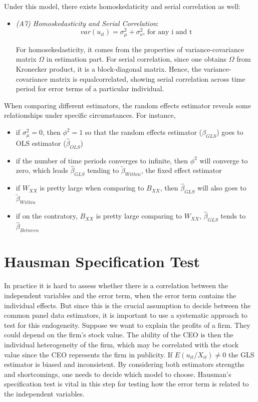 \documentclass[11pt, a4paper, leqno]{article}
\begin{document}
Under this model, there exists homoskedaticity and serial correlation as well:
\begin{itemize}
    \item \textit {(A7) Homoskedasticity and Serial Correlation}:
    \begin{equation}
    var(u_{it}) = \sigma_\mu^2 + \sigma_\nu^2 \text{, for any i and t}
    \end{equation}

    For homosekedasticity, it comes from the properties of variance-covariance matrix $\Omega$ in estimation part. For serial correlation, since one obtains $\Omega$ from Kronecker product, it is a block-diagonal matrix. Hence, the variance-covariance matrix is equalcorrelated, showing serial correlation across time period for error terms of a particular individual.
\end{itemize}

When comparing different estimators, the random effects estimator reveals some relationships under specific circumstances.
For instance, 
\begin{itemize}
    \item if $\sigma_\mu^2 = 0$, then $\phi^2 = 1$ so that the random effects estimator ($\widehat \beta_{GLS}$) goes to OLS estimator ($\widehat \beta_{OLS}$)
    \item if the number of time periods converges to infinite, then $\phi^2$ will converge to zero, which leads $\widehat \beta_{GLS}$ tending to $\widetilde \beta_{Within}$, the fixed effect estimator
    \item if $W_{XX}$ is pretty large when comparing to $B_{XX}$, then $\widehat \beta_{GLS}$ will also goes to $\widetilde \beta_{Within}$
    \item if on the contratory, $B_{XX}$ is pretty large comparing to $W_{XX}$, $\widehat \beta_{GLS}$ tends to $\widehat \beta_{Between}$
\end{itemize}


\section{Hausman Specification Test}
In practice it is hard to assess whether there is a correlation between the independent variables and the error term, when the error term contains the individual effects. But since this is the crucial assumption to decide between the common panel data estimators, it is important to use a systematic approach to test for this endogeneity. Suppose we want to explain the profits of a firm. They could depend on the firm's stock value. The ability of the CEO is then the individual heterogeneity of the firm, which may be correlated with the stock value since the CEO represents the firm in publicity. If $E(u_{it}/X_{it}) \neq 0$ the GLS estimator is biased and inconsistent. By considering both estimators strengths and shortcomings, one needs to decide which model to choose. Hausman's specification test is vital in this step for testing how the error term is related to the independent variables.
\end{document}
